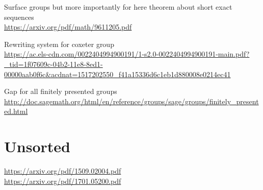 \documentclass[11pt]{article}
\theoremstyle{change}
\theoremstyle{nonumberplain}
\numberwithin{equation}{section}
\begin{document}
Surface groups but more importantly for here theorem about short exact sequences\\
\url{https://arxiv.org/pdf/math/9611205.pdf}

Rewriting system for coxeter group\\
\url{https://ac.els-cdn.com/0022404994900191/1-s2.0-0022404994900191-main.pdf?_tid=1f07609c-04b2-11e8-8ed1-00000aab0f6c&acdnat=1517202550_f41a15336d6c1eb1d880008e0214ec41}

Gap for all finitely presented groups\\
\url{http://doc.sagemath.org/html/en/reference/groups/sage/groups/finitely_presented.html}

\section{Unsorted}

\url{https://arxiv.org/pdf/1509.02004.pdf}\\
\url{https://arxiv.org/pdf/1701.05200.pdf}
\end{document}
